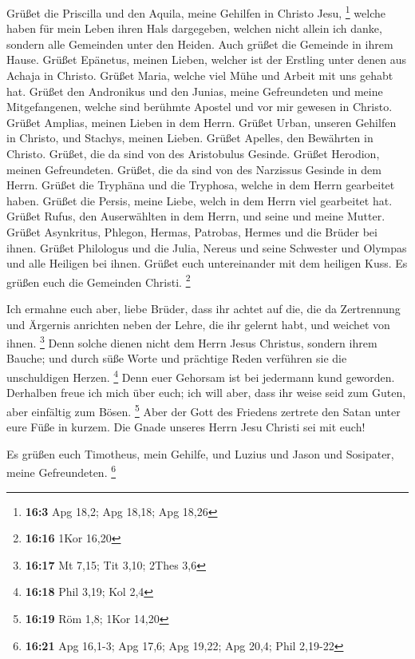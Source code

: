  Grüßet die Priscilla und den Aquila, meine Gehilfen in
Christo Jesu, \footnote{\textbf{16:3} Apg 18,2; Apg 18,18; Apg 18,26}
 welche haben für mein Leben ihren Hals dargegeben,
welchen nicht allein ich danke, sondern alle Gemeinden unter den Heiden.
 Auch grüßet die Gemeinde in ihrem Hause. Grüßet Epänetus,
meinen Lieben, welcher ist der Erstling unter denen aus Achaja in
Christo.  Grüßet Maria, welche viel Mühe und Arbeit mit
uns gehabt hat.  Grüßet den Andronikus und den Junias,
meine Gefreundeten und meine Mitgefangenen, welche sind berühmte Apostel
und vor mir gewesen in Christo.  Grüßet Amplias, meinen
Lieben in dem Herrn.  Grüßet Urban, unseren Gehilfen in
Christo, und Stachys, meinen Lieben.  Grüßet Apelles, den
Bewährten in Christo. Grüßet, die da sind von des Aristobulus Gesinde.
 Grüßet Herodion, meinen Gefreundeten. Grüßet, die da
sind von des Narzissus Gesinde in dem Herrn.  Grüßet die
Tryphäna und die Tryphosa, welche in dem Herrn gearbeitet haben. Grüßet
die Persis, meine Liebe, welch in dem Herrn viel gearbeitet hat.
 Grüßet Rufus, den Auserwählten in dem Herrn, und seine
und meine Mutter.  Grüßet Asynkritus, Phlegon, Hermas,
Patrobas, Hermes und die Brüder bei ihnen.  Grüßet
Philologus und die Julia, Nereus und seine Schwester und Olympas und
alle Heiligen bei ihnen.  Grüßet euch untereinander mit
dem heiligen Kuss. Es grüßen euch die Gemeinden Christi. \footnote{\textbf{16:16}
  1Kor 16,20}

 Ich ermahne euch aber, liebe Brüder, dass ihr achtet auf
die, die da Zertrennung und Ärgernis anrichten neben der Lehre, die ihr
gelernt habt, und weichet von ihnen. \footnote{\textbf{16:17} Mt 7,15;
  Tit 3,10; 2Thes 3,6}  Denn solche dienen nicht dem
Herrn Jesus Christus, sondern ihrem Bauche; und durch süße Worte und
prächtige Reden verführen sie die unschuldigen Herzen. \footnote{\textbf{16:18}
  Phil 3,19; Kol 2,4}  Denn euer Gehorsam ist bei
jedermann kund geworden. Derhalben freue ich mich über euch; ich will
aber, dass ihr weise seid zum Guten, aber einfältig zum Bösen.
\footnote{\textbf{16:19} Röm 1,8; 1Kor 14,20}  Aber der
Gott des Friedens zertrete den Satan unter eure Füße in kurzem. Die
Gnade unseres Herrn Jesu Christi sei mit euch!

 Es grüßen euch Timotheus, mein Gehilfe, und Luzius und
Jason und Sosipater, meine Gefreundeten. \footnote{\textbf{16:21} Apg
  16,1-3; Apg 17,6; Apg 19,22; Apg 20,4; Phil 2,19-22}

